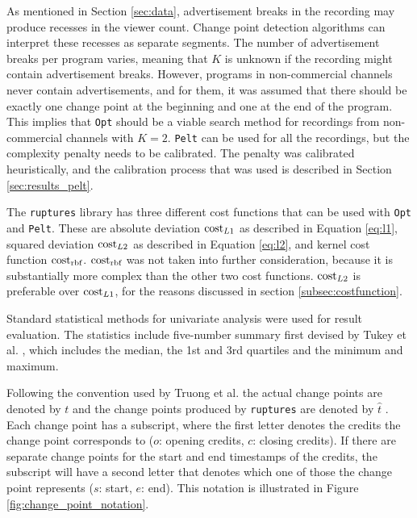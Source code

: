 As mentioned in Section \ref{sec:data}, advertisement breaks in the recording may produce recesses in the viewer count. Change point detection algorithms can interpret these recesses as separate segments. The number of advertisement breaks per program varies, meaning that $K$ is unknown if the recording might contain advertisement breaks. However, programs in non-commercial channels never contain advertisements, and for them, it was assumed that there should be exactly one change point at the beginning and one at the end of the program. This implies that \texttt{Opt} should be a viable search method for recordings from non-commercial channels with $K=2$. \texttt{Pelt} can be used for all the recordings, but the complexity penalty needs to be calibrated. The penalty was calibrated heuristically, and the calibration process that was used is described in Section \ref{sec:results_pelt}.

The \texttt{ruptures} library has three different cost functions that can be used with \texttt{Opt} and \texttt{Pelt}. These are absolute deviation $\operatorname{cost}_{L1}$ as described in Equation \ref{eq:l1}, squared deviation $\operatorname{cost}_{L2}$ as described in Equation \ref{eq:l2}, and kernel cost function $\operatorname{cost}_{\text{rbf}}$. $\operatorname{cost}_{\text{rbf}}$ was not taken into further consideration, because it is substantially more complex than the other two cost functions. 
$\operatorname{cost}_{L2}$ is preferable over $\operatorname{cost}_{L1}$, for the reasons discussed in section \ref{subsec:costfunction}. 

Standard statistical methods for univariate analysis were used for result evaluation. The statistics include five-number summary first devised by Tukey et al. \cite{tukeyExploratoryDataAnalysis1977a}, which includes the median, the 1st and 3rd quartiles and the minimum and maximum.

\newpage
Following the convention used by Truong et al. the actual change points are denoted by $t$ and the change points produced by \texttt{ruptures} are denoted by $\hat{t}$ \cite{truongSelectiveReviewOffline2020}. Each change point has a subscript, where the first letter denotes the credits the change point corresponds to ($o$: opening credits, $c$: closing credits). If there are separate change points for the start and end timestamps of the credits, the subscript will have a second letter that denotes which one of those the change point represents ($s$: start, $e$: end). This notation is illustrated in Figure \ref{fig:change_point_notation}.

